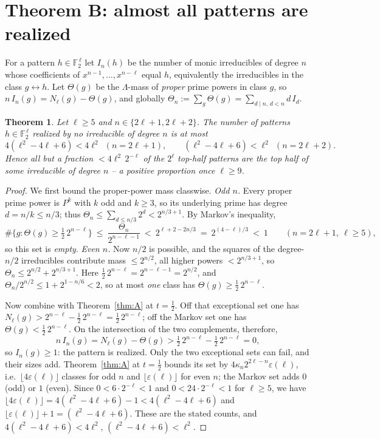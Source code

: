 \documentclass[10pt]{article}
\theoremstyle{plain}
\newtheorem{theorem}{Theorem}
\newcommand{\F}{\mathbb F}
\newcommand{\Lam}{\Lambda}
\begin{document}
\section{Theorem B: almost all patterns are realized}\label{sec:B}

For a pattern $h\in\F_2^{\,\ell}$ let $I_n(h)$ be the number of monic
irreducibles of degree $n$ whose coefficients of $x^{n-1},\dots,x^{n-\ell}$
equal $h$, equivalently the irreducibles in the class $g\leftrightarrow h$.
Let $\Theta(g)$ be the $\Lam$-mass of \emph{proper} prime powers in class $g$,
so $n\,I_n(g)=N_\ell(g)-\Theta(g)$, and globally
$\Theta_n:=\sum_g\Theta(g)=\sum_{d\mid n,\,d<n}d\,I_d$.

\begin{theorem}\label{thm:B}
Let $\ell\ge5$ and $n\in\{2\ell+1,2\ell+2\}$. The number of patterns
$h\in\F_2^{\,\ell}$ realized by \emph{no} irreducible of degree $n$ is at most
\[
 4(\ell^2-4\ell+6)<4\ell^2\ \ (n=2\ell+1),\qquad
 (\ell^2-4\ell+6)<\ell^2\ \ (n=2\ell+2).
\]
Hence all but a fraction $<4\ell^2\,2^{-\ell}$ of the $2^\ell$ top-half
patterns are the top half of some irreducible of degree $n$ -- a positive
proportion once $\ell\ge9$.
\end{theorem}

\begin{proof}
We first bound the proper-power mass classwise. \emph{Odd $n$.} Every proper
prime power is $P^k$ with $k$ odd and $k\ge3$, so its underlying prime has
degree $d=n/k\le n/3$; thus $\Theta_n\le\sum_{d\le n/3}2^d<2^{n/3+1}$. By
Markov's inequality,
\[
 \#\{g:\Theta(g)\ge\tfrac12\,2^{n-\ell}\}
 \ \le\ \frac{\Theta_n}{2^{n-\ell-1}}
 \ <\ 2^{\ell+2-2n/3}\ =\ 2^{(4-\ell)/3}\ <\ 1
 \qquad(n=2\ell+1,\ \ell\ge5),
\]
so this set is \emph{empty}. \emph{Even $n$.} Now $n/2$ is possible, and the
squares of the degree-$n/2$ irreducibles contribute mass $\le2^{n/2}$, all
higher powers $<2^{n/3+1}$, so $\Theta_n\le2^{n/2}+2^{n/3+1}$. Here
$\tfrac12\,2^{n-\ell}=2^{n-\ell-1}=2^{n/2}$, and
$\Theta_n/2^{n/2}\le1+2^{1-n/6}<2$, so at most \emph{one} class has
$\Theta(g)\ge\tfrac12\,2^{n-\ell}$.

Now combine with Theorem~\ref{thm:A} at $t=\tfrac12$. Off that exceptional set
one has $N_\ell(g)>2^{n-\ell}-\tfrac12\,2^{n-\ell}=\tfrac12\,2^{n-\ell}$; off
the Markov set one has $\Theta(g)<\tfrac12\,2^{n-\ell}$. On the intersection of
the two complements, therefore,
\[
 n\,I_n(g)=N_\ell(g)-\Theta(g)>\tfrac12\,2^{n-\ell}-\tfrac12\,2^{n-\ell}=0,
\]
so $I_n(g)\ge1$: the pattern is realized. Only the two exceptional sets can
fail, and their sizes add. Theorem~\ref{thm:A} at $t=\tfrac12$ bounds its set
by $4\kappa_n2^{2\ell-n}\varepsilon(\ell)$, i.e.\ $\lfloor4\varepsilon(\ell)
\rfloor$ classes for odd $n$ and $\lfloor\varepsilon(\ell)\rfloor$ for even $n$;
the Markov set adds $0$ (odd) or $1$ (even). Since
$0<6\cdot2^{-\ell}<1$ and $0<24\cdot2^{-\ell}<1$ for $\ell\ge5$, we have
$\lfloor4\varepsilon(\ell)\rfloor=4(\ell^2-4\ell+6)-1<4(\ell^2-4\ell+6)$ and
$\lfloor\varepsilon(\ell)\rfloor+1=(\ell^2-4\ell+6)$. These are the stated
counts, and $4(\ell^2-4\ell+6)<4\ell^2$, $(\ell^2-4\ell+6)<\ell^2$.
\end{proof}
\end{document}
